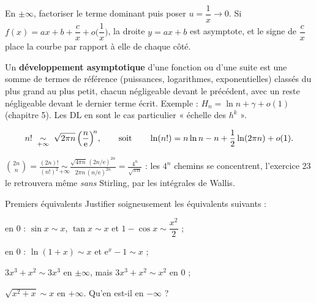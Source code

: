 \begin{savoirfaire}
En $\pm\infty$, factoriser le terme dominant puis poser $u=\dfrac1x\to0$. Si
$f(x)=ax+b+\dfrac{c}{x}+o\bigl(\dfrac1x\bigr)$, la droite $y=ax+b$ est asymptote, et
le signe de $\dfrac{c}{x}$ place la courbe par rapport à elle de chaque côté.
\end{savoirfaire}

\begin{definition}
Un \textbf{développement asymptotique} d'une fonction ou d'une suite est une
somme de termes de référence (puissances, logarithmes, exponentielles)
classés du plus grand au plus petit, chacun négligeable devant le précédent,
avec un reste négligeable devant le dernier terme écrit. Exemple :
$H_n=\ln n+\gamma+o(1)$ (chapitre 5). Les DL en sont le cas particulier
« échelle des $h^{k}$ ».
\end{definition}

\begin{theoreme}
\[
n!\;\underset{+\infty}{\sim}\;\sqrt{2\pi n}\,\Bigl(\frac{n}{\mathrm{e}}\Bigr)^{\!n},
\qquad\text{soit}\qquad
\ln(n!)=n\ln n-n+\frac12\ln(2\pi n)+o(1).
\]
\end{theoreme}

\begin{exemple}
$\displaystyle\binom{2n}{n}=\frac{(2n)!}{(n!)^{2}}
\underset{+\infty}{\sim}\frac{\sqrt{4\pi n}\,(2n/\mathrm{e})^{2n}}
{2\pi n\,(n/\mathrm{e})^{2n}}=\frac{4^{n}}{\sqrt{\pi n}}$ :
les $4^{n}$ chemins se concentrent, l'exercice 23 le retrouvera même
\emph{sans} Stirling, par les intégrales de Wallis.
\end{exemple}

\exercices
{}

\begin{exercice}[1]{Premiers équivalents}
Justifier soigneusement les équivalents suivants :
\begin{questions}
  \item en $0$ : $\sin x\sim x$, $\tan x\sim x$ et $1-\cos x\sim\dfrac{x^{2}}{2}$ ;
  \item en $0$ : $\ln(1+x)\sim x$ et $\mathrm{e}^{x}-1\sim x$ ;
  \item $3x^{3}+x^{2}\sim3x^{3}$ en $\pm\infty$, mais $3x^{3}+x^{2}\sim x^{2}$ en $0$ ;
  \item $\sqrt{x^{2}+x}\sim x$ en $+\infty$. Qu'en est-il en $-\infty$ ?
\end{questions}
\end{exercice}

